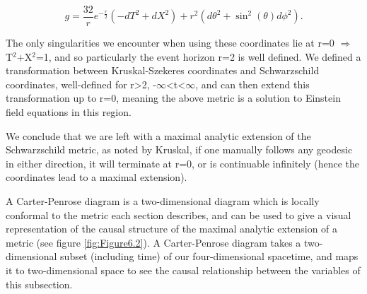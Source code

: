 \documentclass[oneside,openright,frontopenright, singlespacing]{dmathesis}
\begin{document}
	\[g = \frac{32}{r}e^{-\frac{r}{2}}(-dT^2+dX^2)+r^2(d\theta^2+\sin^2(\theta)d\phi^2).\]

\vspace{1em}
	The only singularities we encounter when using these coordinates lie at r=0 $\Rightarrow$ T$^2$+X$^2$=1, and so particularly the event horizon r=2 is well defined. We defined a transformation between Kruskal-Szekeres coordinates and Schwarzschild coordinates, well-defined for r>2, -$\infty$<t<$\infty$, and can then extend this transformation up to r=0, meaning the above metric is a solution to Einstein field equations in this region. 

\vspace{1em}
	We conclude that we are left with a maximal analytic extension of the Schwarzschild metric, as noted by Kruskal, if one manually follows any geodesic in either direction, it will terminate at r=0, or is continuable infinitely (hence the coordinates lead to a maximal extension).

\vspace{1em}
	A Carter-Penrose diagram is a two-dimensional diagram which is locally conformal to the metric each section describes, and can be used to give a visual representation of the causal structure of the maximal analytic extension of a metric (see figure \ref{fig:Figure6.2}). A Carter-Penrose diagram takes a two-dimensional subset (including time) of our four-dimensional spacetime, and maps it to two-dimensional space to see the causal relationship between the variables of this subsection.
\end{document}
